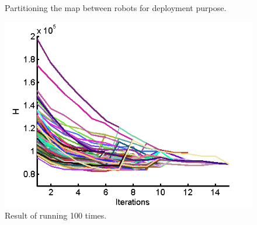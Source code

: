 \documentclass[twocolumn]{svjour3}       %
\begin{document}
\begin{figure}[h]
	\centering	
	\caption{Partitioning the map between robots for deployment purpose.}
	\label{fig:googledeployed}
\end{figure}

\begin{figure}
\centering
\includegraphics[width=0.8 \columnwidth]{Figures/googlemapH100Times.png}
\caption{Result of running 100 times.}
\label{fig:100sim}
\end{figure}
\end{document}
